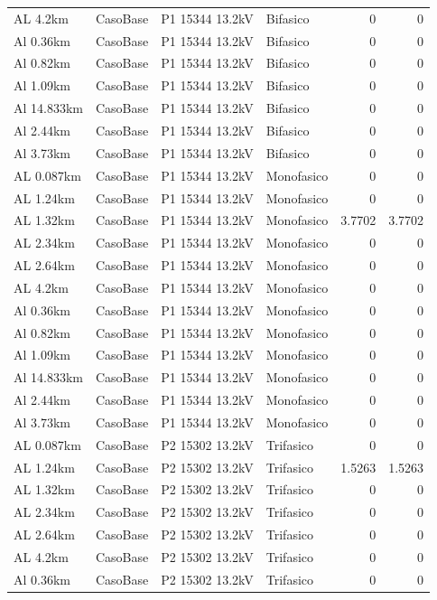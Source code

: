 \documentclass[11pt,a4paper]{article}
\begin{document}
\begin{longtable}{llllrr}
AL 4.2km & CasoBase & P1 15344 13.2kV & Bifasico & 0 & 0 \\
Al 0.36km & CasoBase & P1 15344 13.2kV & Bifasico & 0 & 0 \\
Al 0.82km & CasoBase & P1 15344 13.2kV & Bifasico & 0 & 0 \\
Al 1.09km & CasoBase & P1 15344 13.2kV & Bifasico & 0 & 0 \\
Al 14.833km & CasoBase & P1 15344 13.2kV & Bifasico & 0 & 0 \\
Al 2.44km & CasoBase & P1 15344 13.2kV & Bifasico & 0 & 0 \\
Al 3.73km & CasoBase & P1 15344 13.2kV & Bifasico & 0 & 0 \\
AL 0.087km & CasoBase & P1 15344 13.2kV & Monofasico & 0 & 0 \\
AL 1.24km & CasoBase & P1 15344 13.2kV & Monofasico & 0 & 0 \\
AL 1.32km & CasoBase & P1 15344 13.2kV & Monofasico & 3.7702 & 3.7702 \\
AL 2.34km & CasoBase & P1 15344 13.2kV & Monofasico & 0 & 0 \\
AL 2.64km & CasoBase & P1 15344 13.2kV & Monofasico & 0 & 0 \\
AL 4.2km & CasoBase & P1 15344 13.2kV & Monofasico & 0 & 0 \\
Al 0.36km & CasoBase & P1 15344 13.2kV & Monofasico & 0 & 0 \\
Al 0.82km & CasoBase & P1 15344 13.2kV & Monofasico & 0 & 0 \\
Al 1.09km & CasoBase & P1 15344 13.2kV & Monofasico & 0 & 0 \\
Al 14.833km & CasoBase & P1 15344 13.2kV & Monofasico & 0 & 0 \\
Al 2.44km & CasoBase & P1 15344 13.2kV & Monofasico & 0 & 0 \\
Al 3.73km & CasoBase & P1 15344 13.2kV & Monofasico & 0 & 0 \\
AL 0.087km & CasoBase & P2 15302 13.2kV & Trifasico & 0 & 0 \\
AL 1.24km & CasoBase & P2 15302 13.2kV & Trifasico & 1.5263 & 1.5263 \\
AL 1.32km & CasoBase & P2 15302 13.2kV & Trifasico & 0 & 0 \\
AL 2.34km & CasoBase & P2 15302 13.2kV & Trifasico & 0 & 0 \\
AL 2.64km & CasoBase & P2 15302 13.2kV & Trifasico & 0 & 0 \\
AL 4.2km & CasoBase & P2 15302 13.2kV & Trifasico & 0 & 0 \\
Al 0.36km & CasoBase & P2 15302 13.2kV & Trifasico & 0 & 0 \\

\end{longtable}
\end{document}
